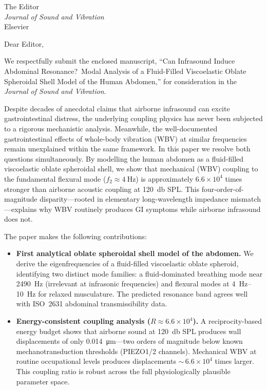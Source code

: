 \documentclass[11pt]{letter}
\begin{document}
\begin{letter}{%
  The Editor\\
  \textit{Journal of Sound and Vibration}\\
  Elsevier}

\opening{Dear Editor,}

We respectfully submit the enclosed manuscript, ``Can Infrasound Induce
Abdominal Resonance?\ Modal Analysis of a Fluid-Filled Viscoelastic Oblate
Spheroidal Shell Model of the Human Abdomen,'' for consideration in the
\textit{Journal of Sound and Vibration}.

Despite decades of anecdotal claims that airborne infrasound can excite
gastrointestinal distress, the underlying coupling physics has never been
subjected to a rigorous mechanistic analysis.  Meanwhile, the well-documented
gastrointestinal effects of whole-body vibration (WBV) at similar frequencies
remain unexplained within the same framework.  In this paper we resolve both
questions simultaneously.  By modelling the human abdomen as a fluid-filled
viscoelastic oblate spheroidal shell, we show that mechanical (WBV) coupling
to the fundamental flexural mode ($f_2 \approx \SI{4}{\hertz}$) is
approximately $6.6 \times 10^4$ times stronger than airborne acoustic coupling at
\SI{120}{\decibel} SPL.  This four-order-of-magnitude disparity---rooted in
elementary long-wavelength impedance mismatch---explains why WBV routinely
produces GI symptoms while airborne infrasound does not.

The paper makes the following contributions:

\begin{itemize}
  \item \textbf{First analytical oblate spheroidal shell model of the abdomen.}
    We derive the eigenfrequencies of a fluid-filled viscoelastic oblate
    spheroid, identifying two distinct mode families: a fluid-dominated
    breathing mode near \SI{2490}{\hertz} (irrelevant at infrasonic frequencies)
    and flexural modes at \SIrange{4}{10}{\hertz} for relaxed musculature.
    The predicted resonance band agrees well with ISO~2631 abdominal
    transmissibility data.

  \item \textbf{Energy-consistent coupling analysis ($R \approx 6.6 \times 10^4$).}
    A reciprocity-based energy budget shows that airborne sound at
    \SI{120}{\decibel} SPL produces wall displacements of only
    \SI{0.014}{\micro\metre}---two orders of magnitude below known
    mechanotransduction thresholds (PIEZO1/2 channels).  Mechanical WBV at
    routine occupational levels produces displacements ${\sim}\,6.6 \times 10^4$ times
    larger.  This coupling ratio is robust across the full physiologically
    plausible parameter space.


\end{itemize}
\end{letter}
\end{document}
